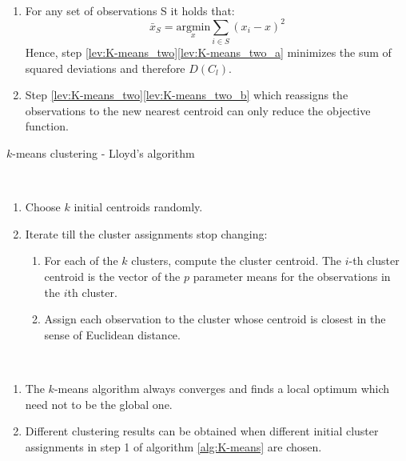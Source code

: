 \begin{remark}~
	\begin{enumerate}[label=(\roman*)]
		\item For any set of observations S it holds that: 
			\begin{equation*}
				\bar x_S = \underset{x}{\text{argmin}}\sum_{i \in S} (x_i - x)^2
			\end{equation*}
			Hence, step \ref{lev:K-means_two}\ref{lev:K-means_two_a} minimizes the sum of squared deviations and therefore $D(C_l)$.
		\item Step \ref{lev:K-means_two}\ref{lev:K-means_two_b} which reassigns the observations to the new nearest centroid can only reduce the objective function.
	\end{enumerate}
\end{remark}

	
\begin{algorithm}
	\caption{$k$-means clustering \cite{Introducion_Stat_Learning} - Lloyd's algorithm}\label{alg:K-means}
\begin{algorithmic}
\\
	\begin{enumerate}
	\item Choose $k$ initial centroids randomly.
	\item  \label{lev:K-means_two}Iterate till the cluster assignments stop changing:
	\begin{enumerate}[label=\emph{\alph*})]
		\item \label{lev:K-means_two_a} For each of the $k$ clusters, compute the cluster centroid. The $i$-th cluster centroid is the vector of the $p$ parameter means for the observations in the $i$th cluster. 
		\item \label{lev:K-means_two_b}Assign each observation to the cluster whose centroid is closest in the sense of Euclidean distance. 
	\end{enumerate}
	\end{enumerate}
\end{algorithmic}
\end{algorithm}

\begin{remark}~
	\begin{enumerate}[label=(\roman*)]
		\item The $k$-means algorithm always converges and finds a local optimum which need not to be the global one.
		\item Different clustering results can be obtained when different initial cluster assignments in step 1 of algorithm \ref{alg:K-means} are chosen.
	\end{enumerate}
\end{remark}


